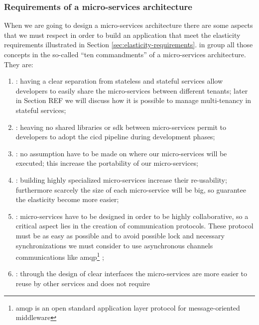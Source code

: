 \subsubsection{Requirements of a micro-services architecture}
\label{sec:architecture-soaRevisitation-microServices-requirements}
When we are going to design a micro-services architecture there are some aspects that we must respect in order
to build an application that meet the elasticity requirements illustrated in Section \ref{sec:elasticity-requirements}.
\citeauthor{microservicesCommandments} in \cite{microservicesCommandments} group all those concepts in the
so-called ``ten commandments'' of a micro-services architecture. They are:

\begin{enumerate}
	\item{: having a clear separation from
		stateless and stateful services allow developers to easily share the micro-services between
		different tenants; later in Section REF we will discuss how it is possible to manage multi-tenancy
		in stateful services;}
	\item{: heaving no shared libraries or \ac{sdk} between
		micro-services permit to developers to adopt the \ac{cicd} pipeline during development phases;}
	\item{: no assumption have to be made on where our micro-services will
		be executed; this increase the portability of our micro-services;}
	\item{: building highly specialized micro-services
		increase their re-usability; furthermore scarcely the size of each micro-service will be big, so
		guarantee the elasticity become more easier;}
	\item{: micro-services have to be
		designed in order to be highly collaborative, so a critical aspect lies in the creation of
		communication protocols. These protocol must be as easy as possible and to avoid possible lock 
		and necessary synchronizations we must consider to use asynchronous channels communications
		like \ac{amqp}\footnote{\ac{amqp} is an open standard application layer protocol for
		message-oriented middleware} \cite{amqpProtocol};}
	\item{: through the design of clear
		interfaces the micro-services are more easier to reuse by other services and does not require
}
\end{enumerate}
